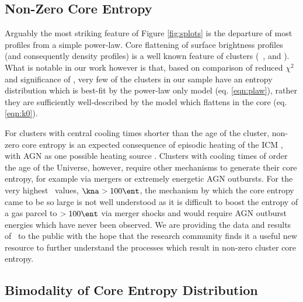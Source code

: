 \documentclass{emulateapj}
\begin{document}
\subsection{Non-Zero Core Entropy}
\label{sec:nonzerok0}

Arguably the most striking feature of Figure \ref{fig:splots} is the
departure of most profiles from a simple power-law. Core flattening of
surface brightness profiles (and consequently density profiles) is a
well known feature of clusters (\eg\ \citealt{1984ApJ...276...38J},
\citealt{1999ApJ...517..627M} and \citealt{2000MNRAS.318..715X}). What
is notable in our work however is that, based on comparison of reduced
$\chi^2$ and significance of \kna, very few of the clusters in our
sample have an entropy distribution which is best-fit by the power-law
only model (eq. \ref{eqn:plaw}), rather they are sufficiently
well-described by the model which flattens in the core
(eq. \ref{eqn:k0}).

For clusters with central cooling times shorter than the age of the
cluster, non-zero core entropy is an expected consequence of episodic
heating of the ICM \citep{agnframework}, with AGN as one possible
heating source \citep{1997MNRAS.288..355B, 2000ApJ...532...17L,
2001Natur.414..425V, 2001ApJ...549..832S, 2002MNRAS.332..729C,
2002Natur.418..301B, 2002MNRAS.331..545B, 2002MNRAS.333..145N,
2002ApJ...581..223R, 2002MNRAS.335..610A, 2004MNRAS.348.1105O,
2004ApJ...613..811M, 2004ApJ...615..681R, 2004ApJ...617..896H,
2004MNRAS.355..995D, 2005ApJ...622..847S, pizzolato05,
2006ApJ...643..120B, 2006ApJ...638..659M}. Clusters with cooling times
of order the age of the Universe, however, require other mechanisms to
generate their core entropy, for example via mergers or extremely
energetic AGN outbursts. For the very highest \kna\ values, $\kna >
100 \ent$, the mechanism by which the core entropy came to be so large
is not well understood as it is difficult to boost the entropy of a
gas parcel to $> 100 \ent$ via merger shocks
\citep{2008MNRAS.386.1309M} and would require AGN outburst energies
which have never been observed. We are providing the data and results
of \accept\ to the public with the hope that the research community
finds it a useful new resource to further understand the processes
which result in non-zero cluster core entropy.

\subsection{Bimodality of Core Entropy Distribution}
\label{sec:bimod}
\end{document}
